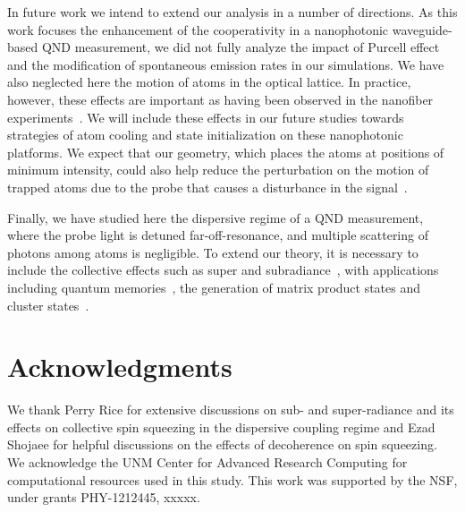 \documentclass[preprint,aps,pra,onecolumn,superscriptaddress]{revtex4-1} %
\begin{document}
In future work we intend to extend our analysis in a number of directions.  As this work focuses the enhancement of the cooperativity in a nanophotonic waveguide-based QND measurement, we did not fully analyze the impact of Purcell effect and the modification of spontaneous emission rates in our simulations.  We have also neglected here the motion of atoms in the optical lattice. In practice, however, these effects are important as having been observed in the nanofiber  experiments~\cite{Solano2017Dynamics, Solano2017Alignment, Beguin2017Observation, Solano2017Optical}.  We will include these effects in our future studies towards strategies of atom cooling and state initialization on these nanophotonic platforms. We expect that our geometry, which places the atoms at positions of minimum intensity, could also help reduce the perturbation on the motion of trapped atoms due to the probe that causes a disturbance in the signal~\cite{Solano2017Dynamics}.  

Finally, we have studied here the dispersive regime of a QND measurement, where the probe light is detuned far-off-resonance, and multiple scattering  of photons among atoms is negligible. To extend our theory, it is necessary to include the collective effects such as super and subradiance~\cite{Asenjo-Garcia2017Exponential, Asenjo-Garcia2017Atom, Solano2017Super}, with applications including quantum memories~\cite{Sayrin2015, Gouraud2015Demonstration},  the generation of matrix product states and cluster states~\cite{Economou2010, Lodahl2017Chiral, Schwartz2016Deterministic, Pichler2016Photonic, Pichler2017Photonic}.  


\section{Acknowledgments}
{\color{blue} We thank Perry Rice for extensive discussions on sub- and super-radiance and its effects on collective spin squeezing in the dispersive coupling regime and Ezad Shojaee for helpful discussions on the effects of decoherence on spin squeezing. We  acknowledge the UNM Center for Advanced Research Computing for computational resources used in this study.
This work was supported by the NSF, under grants PHY-1212445, xxxxx.}
\end{document}
